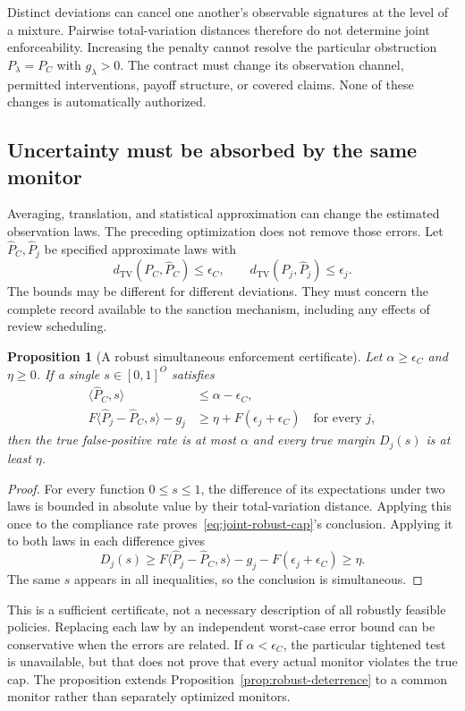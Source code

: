\documentclass[11pt,letterpaper]{article}
\theoremstyle{plain}
\newtheorem{proposition}{Proposition}[section]
\theoremstyle{definition}
\theoremstyle{remark}
\newcommand{\TV}{d_{\mathrm{TV}}}
\begin{document}
Distinct deviations can cancel one another's observable signatures at the level of a mixture. Pairwise total-variation distances therefore do not determine joint enforceability. Increasing the penalty cannot resolve the particular obstruction $P_\lambda=P_C$ with $g_\lambda>0$. The contract must change its observation channel, permitted interventions, payoff structure, or covered claims. None of these changes is automatically authorized.

\subsection{Uncertainty must be absorbed by the same monitor}
Averaging, translation, and statistical approximation can change the estimated observation laws. The preceding optimization does not remove those errors. Let $\widehat P_C,\widehat P_j$ be specified approximate laws with
\[
\TV(P_C,\widehat P_C)\leq\epsilon_C,
\qquad
\TV(P_j,\widehat P_j)\leq\epsilon_j.
\]
The bounds may be different for different deviations. They must concern the complete record available to the sanction mechanism, including any effects of review scheduling.

\begin{proposition}[A robust simultaneous enforcement certificate]\label{prop:joint-robust}
Let $\alpha\geq\epsilon_C$ and $\eta\geq0$. If a single $s\in[0,1]^O$ satisfies
\begin{align}
\langle\widehat P_C,s\rangle&\leq\alpha-\epsilon_C,\label{eq:joint-robust-cap}\\
F\langle\widehat P_j-\widehat P_C,s\rangle-g_j
&\geq\eta+F(\epsilon_j+\epsilon_C)
\quad\text{for every }j,\label{eq:joint-robust-gap}
\end{align}
then the true false-positive rate is at most $\alpha$ and every true margin $D_j(s)$ is at least $\eta$.
\end{proposition}
\begin{proof}
For every function $0\leq s\leq1$, the difference of its expectations under two laws is bounded in absolute value by their total-variation distance. Applying this once to the compliance rate proves~\eqref{eq:joint-robust-cap}'s conclusion. Applying it to both laws in each difference gives
\[
D_j(s)\geq F\langle\widehat P_j-\widehat P_C,s\rangle-g_j
-F(\epsilon_j+\epsilon_C)\geq\eta.
\]
The same $s$ appears in all inequalities, so the conclusion is simultaneous.
\end{proof}

This is a sufficient certificate, not a necessary description of all robustly feasible policies. Replacing each law by an independent worst-case error bound can be conservative when the errors are related. If $\alpha<\epsilon_C$, the particular tightened test is unavailable, but that does not prove that every actual monitor violates the true cap. The proposition extends Proposition~\ref{prop:robust-deterrence} to a common monitor rather than separately optimized monitors.
\end{document}
